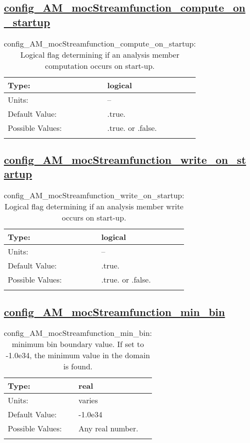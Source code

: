 \subsection[config\_AM\_mocStreamfunction\_compute\_on\_startup]{\hyperref[sec:nm_tab_AM_mocStreamfunction]{config\_AM\_mocStreamfunction\_compute\_on\_startup}}
\label{subsec:nm_sec_config_AM_mocStreamfunction_compute_on_startup}
\begin{center}
\begin{longtable}{| p{2.0in} || p{4.0in} |}
    \hline
    Type: & logical \\
    \hline
    Units: & -- \\
    \hline
    Default Value: & .true. \\
    \hline
    Possible Values: & .true. or .false. \\
    \hline
    \caption{config\_AM\_mocStreamfunction\_compute\_on\_startup: Logical flag determining if an analysis member computation occurs on start-up.}
\end{longtable}
\end{center}
\subsection[config\_AM\_mocStreamfunction\_write\_on\_startup]{\hyperref[sec:nm_tab_AM_mocStreamfunction]{config\_AM\_mocStreamfunction\_write\_on\_startup}}
\label{subsec:nm_sec_config_AM_mocStreamfunction_write_on_startup}
\begin{center}
\begin{longtable}{| p{2.0in} || p{4.0in} |}
    \hline
    Type: & logical \\
    \hline
    Units: & -- \\
    \hline
    Default Value: & .true. \\
    \hline
    Possible Values: & .true. or .false. \\
    \hline
    \caption{config\_AM\_mocStreamfunction\_write\_on\_startup: Logical flag determining if an analysis member write occurs on start-up.}
\end{longtable}
\end{center}
\subsection[config\_AM\_mocStreamfunction\_min\_bin]{\hyperref[sec:nm_tab_AM_mocStreamfunction]{config\_AM\_mocStreamfunction\_min\_bin}}
\label{subsec:nm_sec_config_AM_mocStreamfunction_min_bin}
\begin{center}
\begin{longtable}{| p{2.0in} || p{4.0in} |}
    \hline
    Type: & real \\
    \hline
    Units: & \si{varies} \\
    \hline
    Default Value: & -1.0e34 \\
    \hline
    Possible Values: & Any real number. \\
    \hline
    \caption{config\_AM\_mocStreamfunction\_min\_bin: minimum bin boundary value.  If set to -1.0e34, the minimum value in the domain is found.}
\end{longtable}
\end{center}
